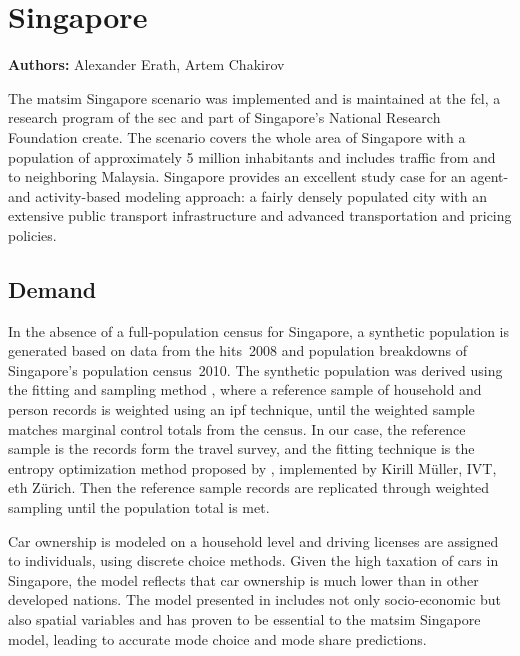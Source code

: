 \section{Singapore}
\label{sec:singapore}
\hfill \textbf{Authors:} Alexander Erath, Artem Chakirov

The \gls{matsim} Singapore scenario \citet[][]{ErathEtAl_TechRep_FCL_forth} was implemented and is maintained at the \gls{fcl}, a research program of the \gls{sec} and part of Singapore's National Research Foundation \gls{create}. The scenario covers the whole area of Singapore with a population of approximately 5 million inhabitants and includes traffic from and to neighboring Malaysia. Singapore provides an excellent study case for an agent- and activity-based modeling approach: a fairly densely populated city with an extensive public transport infrastructure and advanced transportation and pricing policies. 

\subsection{Demand}
In the absence of a full-population census for Singapore, a synthetic population is generated based on data from the \gls{hits}~2008 \citep[][]{Choi_JOUR_2010} and population breakdowns of Singapore’s population census~2010. The synthetic population was derived using the fitting and sampling method \citep{MuellerKAxhausen_TRB_2011}, where a reference sample of household and person records is weighted using an \gls{ipf} technique, until the weighted sample matches marginal control totals from the census. In our case, the reference sample is the records form the travel survey, and the fitting technique is the entropy optimization method proposed by \citet[][]{BarGeraEtAl_TRB_2009}, implemented by Kirill Müller, IVT, \gls{eth} Zürich. Then the reference sample records are replicated through weighted sampling until the population total is met. 
 
Car ownership is modeled on a household level and driving licenses are assigned to individuals, using discrete choice methods. Given the high taxation of cars in Singapore, the model reflects that car ownership is much lower than in other developed nations. The model presented in \citet[][]{VanEggermondEtAl_IATBR_2012} includes not only socio-economic but also spatial variables and has proven to be essential to the \gls{matsim} Singapore model, leading to accurate mode choice and mode share predictions. 

